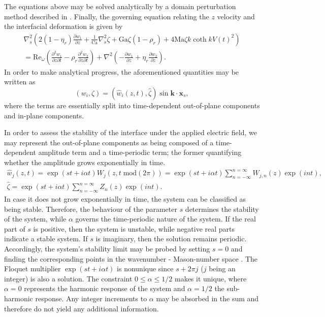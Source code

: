 \documentclass{jfm_arxiv}
\newcommand{\xs}{\mathbf{x}_s}
\newcommand{\zc}{\hat{\zeta}}
\newcommand{\bk}{\mathbf{k}}
\newcommand{\Ma}{\text{Ma}}
\newcommand{\Ca}{\text{Ca}}
\newcommand{\Ga}{\text{Ga}}
\renewcommand{\Re}{\text{Re}_\omega}
\begin{document}
The equations above may be solved analytically by a domain perturbation method described in \citet{Bandopadhyay2017}.
%
Finally, the governing equation relating the $z$ velocity and the interfacial deformation is given by
\begin{multline}
  \nabla_s^2\left(2(1-\eta_r)\frac{\partial w_1}{\partial z}+\frac{1}{\Ca}\nabla_s^2\zeta + \Ga \zeta (1-\rho_r) + 4\Ma\zeta k \coth k V(t)^2 \right) \\= \Re \left(\frac{\partial^2 w_1}{\partial z\partial t} -\rho_r \frac{\partial^2 w_2}{\partial z\partial t}\right) + \nabla^2\left( -\frac{\partial w_1}{\partial z} + \eta_r\frac{\partial w_2}{\partial z}\right).
  \label{eq:mason2}
\end{multline}
In order to make analytical progress, the aforementioned quantities may be written as
\begin{equation}
(w_i,\zeta) = (\hat{w}_i(z,t), \zc) \sin \bk\cdot\xs,
\end{equation}
where the terms are essentially split into time-dependent out-of-plane components and in-plane components.

In order to assess the stability of the interface under the applied electric field, we may represent the out-of-plane components as being composed of a time-dependent amplitude term and a time-periodic term; the former quantifying whether the amplitude grows exponentially in time.
\begin{gather}
\hat{w}_j(z,t) = \exp(st+i\alpha t)W_j(z,t\; \text{mod} (2\pi)) =  
\exp(st+i\alpha t) \sum\limits_{n=-\infty}^{n=\infty} W_{j,n}(z) \exp(in t),\\
\zc = \exp(st+i\alpha t) \sum\limits_{n=-\infty}^{n=\infty} Z_{n}(z)\exp(in t).
\label{eq:var_forms}
\end{gather}
In case it does not grow exponentially in time, the system can be classified as being stable.
Therefore, the behaviour of the parameter $s$ determines the stability of the system, while $\alpha$ governs the time-periodic nature of the system. If the real part of $s$ is positive, then the system is unstable, while negative real parts indicate a stable system. If $s$ is imaginary, then the solution remains periodic.
Accordingly, the system's stability limit may be probed by setting $s =0$ and finding the corresponding points in the wavenumber - Mason-number space \citep{Bandopadhyay2017}. The Floquet multiplier $\exp(st+i\alpha t)$ is nonunique since $s+2\pi j$ ($j$ being an integer) is also a solution. The constraint $0\leq \alpha \leq 1/2$ makes it unique, where $\alpha = 0$ represents the harmonic response of the system and $\alpha = 1/2$ the sub-harmonic response. Any integer increments to $\alpha$ may be absorbed in the sum and therefore do not yield any additional information.
\end{document}

